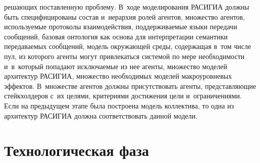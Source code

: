 \begin{multicols}{2}
\begin{itemize}
ре\-ша\-ющих по\-став\-лен\-ную проб\-ле\-му. В~ходе моделирования \mbox{РАСИГИА} 
должны быть специфицированы со\-став и~иерархия ролей агентов, множество 
агентов, ис\-поль\-зу\-емые протоколы взаимодействия, под\-дер\-жи\-ва\-емые языки 
передачи сообщений, базовая онтология как осно\-ва для интерпретации 
семантики пе\-ре\-да\-ва\-емых сообщений, модель окру\-жа\-ющей среды, содержащая 
в~том чис\-ле пул, из которого агенты могут привлекаться сис\-те\-мой по мере 
не\-об\-хо\-ди\-мости и~в~который попадают ис\-клю\-ча\-емые из нее агенты, множество 
моделей архитектур \mbox{РАСИГИА}, множество необходимых моделей 
мак\-ро\-уров\-не\-вых эффектов. В~множестве агентов должны присутствовать 
агенты, пред\-став\-ля\-ющие стейк\-хол\-де\-ров с~их целями, критериями достижения 
цели и~ограничениями. Если на предыду\-щем этапе была по\-стро\-ена модель 
коллектива, то одна из архитектур \mbox{РАСИГИА} долж\-на соответствовать 
данной модели. 
  \end{itemize}
  
\section{Технологическая фаза}


\end{multicols}
